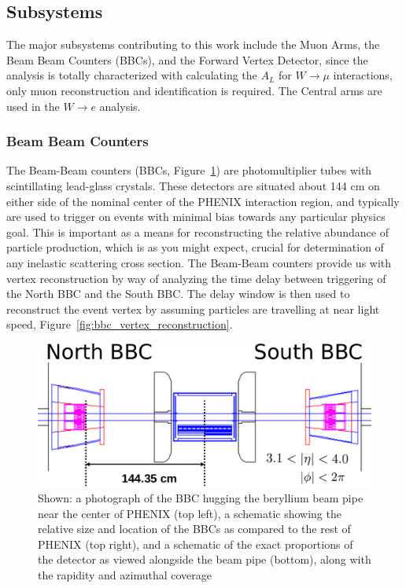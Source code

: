 \subsection{Subsystems}

The major subsystems contributing to this work include the Muon Arms, the Beam
Beam Counters (BBCs), and the Forward Vertex Detector, since the analysis is
totally characterized with calculating the $A_L$ for $W\rightarrow\mu$
interactions, only muon reconstruction and identification is required. The
Central arms are used in the $W\rightarrow e$ analysis. 

\subsubsection{Beam Beam Counters}

The Beam-Beam counters (BBCs, Figure~\ref{fig:bbc_overview}) are photomultiplier
tubes with scintillating lead-glass crystals. These detectors are situated about
144 cm on either side of the nominal center of the PHENIX interaction region,
and typically are used to trigger on events with minimal bias towards any
particular physics goal. This is important as a means for reconstructing the
relative abundance of particle production, which is as you might expect, crucial
for determination of any inelastic scattering cross section. The Beam-Beam
counters provide us with vertex reconstruction by way of analyzing the time
delay between triggering of the North BBC and the South BBC. The delay window is
then used to reconstruct the event vertex by assuming particles are travelling
at near light speed, Figure~\ref{fig:bbc_vertex_reconstruction}. 

\begin{figure}[ht]
  \centering
  \includegraphics[width=\linewidth]{./figures/bbc_overview}
  \caption{
    Shown: a photograph of the BBC hugging the beryllium beam pipe near the
    center of PHENIX (top left), a schematic showing the relative size and
    location of the BBCs as compared to the rest of PHENIX (top right), and a
    schematic of the exact proportions of the detector as viewed alongside the
    beam pipe (bottom), along with the rapidity and azimuthal
    coverage~\cite{Nakamura2002}
  }
  \label{fig:bbc_overview}
\end{figure}

